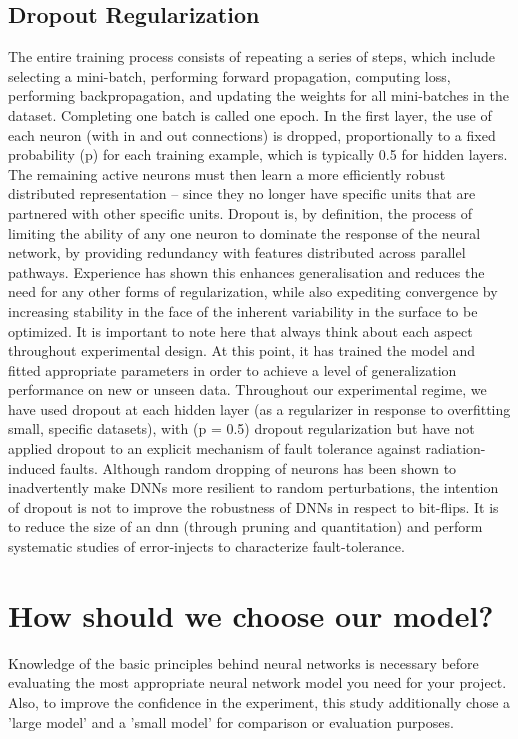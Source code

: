    \subsection{Dropout Regularization}
    The entire training process consists of repeating a series of steps, which include selecting a mini-batch, performing forward propagation, computing loss, performing backpropagation, and updating the weights for all mini-batches in the dataset. Completing one batch is called one epoch. In the first layer, the use of each neuron (with in and out connections) is dropped, proportionally to a fixed probability (p) for each training example, which is typically 0.5 for hidden layers. The remaining active neurons must then learn a more efficiently robust distributed representation -- since they no longer have specific units that are partnered with other specific units.
    Dropout is, by definition, the process of limiting the ability of any one neuron to dominate the response of the neural network, by providing redundancy with features distributed across parallel pathways. Experience has shown this enhances generalisation and reduces the need for any other forms of regularization, while also expediting convergence by increasing stability in the face of the inherent variability in the surface to be optimized. It is important to note here that always think about each aspect throughout experimental design. At this point, it has trained the model and fitted appropriate parameters in order to achieve a level of generalization performance on new or unseen data. 
    Throughout our experimental regime, we have used dropout at each hidden layer (as a regularizer in response to overfitting small, specific datasets), with (p = 0.5) dropout regularization but have not applied dropout to an explicit mechanism of fault tolerance against radiation-induced faults. Although random dropping of neurons has been shown to inadvertently make DNNs more resilient to random perturbations, the intention of dropout is not to improve the robustness of DNNs in respect to bit-flips. It is to reduce the size of an \gls{dnn} (through pruning and quantitation) and perform systematic studies of error-injects to characterize fault-tolerance.



\section{How should we choose our model?}

Knowledge of the basic principles behind neural networks is necessary before evaluating the most appropriate neural network model you need for your project. Also, to improve the confidence in the experiment, this study additionally chose a 'large model' and a 'small model' for comparison or evaluation purposes.

